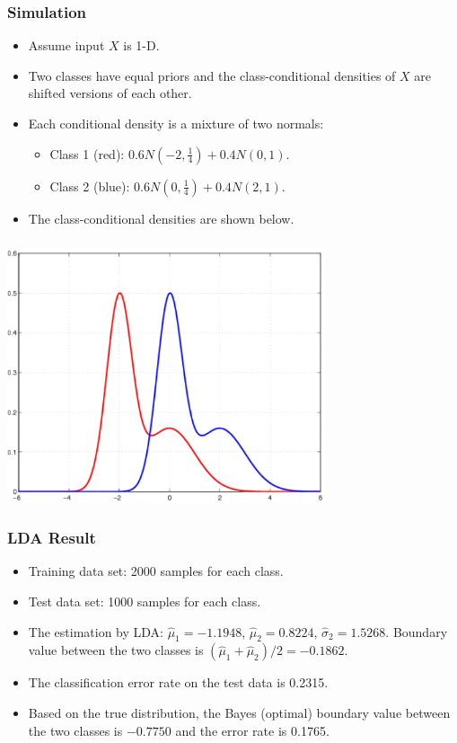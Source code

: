 \documentclass[12pt,notes,mathserif]{beamer}
\begin{document}
\begin{frame}[c]
	\frametitle{Simulation}
	\begin{itemize}
		\item Assume input $X$ is 1-D.
		\item  Two classes have equal priors and the class-conditional densities of $X$ are shifted versions of each other.

		\item  Each conditional density is a mixture of two normals:
		      \begin{itemize}
			      \item
			            Class 1 (red): $0.6N\left(−2,\frac14\right)+0.4N(0,1)$.
			      \item
			            Class 2 (blue): $0.6N\left(0,\frac14\right)+0.4N(2,1)$.
		      \end{itemize}
		\item The class-conditional densities are shown below.
	\end{itemize}
\end{frame}

\begin{frame}[c]
	\frametitle{}
	\begin{center}
		\includegraphics[width=0.7\textwidth]{lec12-40.jpg}
	\end{center}
\end{frame}

\begin{frame}[c]
	\frametitle{LDA Result}
	\begin{itemize}
		\item Training data set: 2000 samples for each class.

		\item  Test data set: 1000 samples for each class.

		\item The estimation by LDA: $\hat{\mu}_1 = −1.1948$, $\hat{\mu}_2 = 0.8224$, $\hat{\sigma}_2 = 1.5268$. Boundary value between the two classes is $(\hat{\mu}_1 +\hat{\mu}_ 2)/2 =−0.1862$.

		\item  The classification error rate on the test data is 0.2315.
		\item
		      Based on the true distribution, the Bayes (optimal) boundary value between the two classes is $−0.7750$ and the error rate is 0.1765.
	\end{itemize}
\end{frame}
\end{document}
